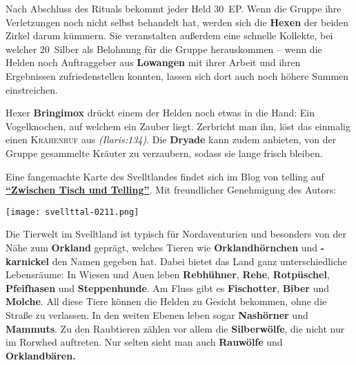 \vfill


Nach Abschluss des Rituals bekommt jeder Held 30~EP.
Wenn die Gruppe ihre Verletzungen noch nicht selbst behandelt hat, werden sich die \textbf{Hexen} der beiden Zirkel darum kümmern.
Sie veranstalten außerdem eine schnelle Kollekte, bei welcher 20~Silber als Belohnung für die Gruppe herauskommen -- wenn die Helden noch Auftraggeber aus \textbf{Lowangen} mit ihrer Arbeit und ihren Ergebnissen zufriedenstellen konnten, lassen sich dort auch noch höhere Summen einstreichen. 

Hexer \textbf{Bringimox} drückt einem der Helden noch etwas in die Hand:
Ein Vogelknochen, auf welchem ein Zauber liegt. Zerbricht man ihn, löst das einmalig einen \textsc{Krähenruf} aus \emph{(Ilaris:134)}.
Die \textbf{Dryade} kann zudem anbieten, von der Gruppe gesammelte Kräuter zu verzaubern, sodass sie lange frisch bleiben.

\neueseite

\spaltenende
Eine fangemachte Karte des Svelltlandes findet sich im Blog von telling auf \href{https://tellingaventurien.home.blog/2023/02/27/karte-svelltland-um-1045-nach-bosparans-fall/}{\textbf{\enquote{Zwischen Tisch und Telling}}}. Mit freundlicher Genehmigung des Autors:

\begin{center}
\texttt{[image: svellttal-0211.png]}
\end{center}

\newpage

\spaltenanfang



\label{svellt}
Die Tierwelt im Svelltland ist typisch für Nordaventurien und besonders von der Nähe zum \textbf{Orkland} geprägt,
welches Tieren wie \textbf{Orklandhörnchen} und \textbf{-karnickel} den Namen gegeben hat.
Dabei bietet das Land ganz unterschiedliche Lebensräume:
In Wiesen und Auen leben \textbf{Rebhühner}, \textbf{Rehe}, \textbf{Rotpüschel}, \textbf{Pfeifhasen} und \textbf{Steppenhunde}.
Am Fluss gibt es \textbf{Fischotter}, \textbf{Biber} und \textbf{Molche}. All diese Tiere können die Helden zu Gesicht bekommen, ohne die Straße zu verlassen. In den weiten Ebenen leben sogar \textbf{Nashörner} und \textbf{Mammuts}.
Zu den Raubtieren zählen vor allem die \textbf{Silberwölfe}, die nicht nur im Rorwhed auftreten. Nur selten sieht man auch \textbf{Rauwölfe} und \textbf{Orklandbären.}


